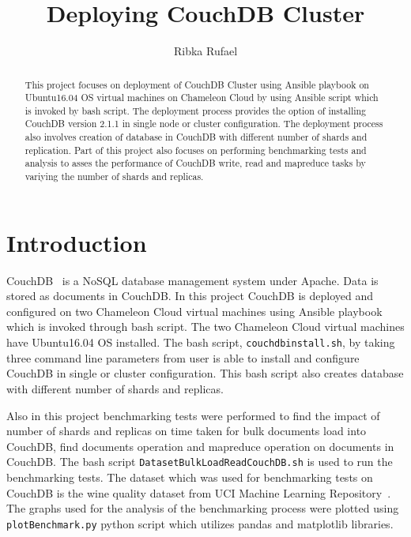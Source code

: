 \title{Deploying CouchDB Cluster}


\author{Ribka Rufael}
\orcid{}



\renewcommand{\shortauthors}{R. Rufael}


\begin{abstract}
  This project focuses on deployment of CouchDB Cluster using Ansible
  playbook on Ubuntu16.04 OS virtual machines on Chameleon Cloud by
  using Ansible script which is invoked by bash script. The deployment
  process provides the option of installing CouchDB version 2.1.1 in single node or
  cluster configuration. The deployment process also involves creation
  of database in CouchDB with different number of shards and replication. Part of this project
  also focuses on performing  benchmarking tests and analysis to asses the
  performance of CouchDB write, read and mapreduce tasks by variying
  the number of shards and replicas. 
\end{abstract}



\maketitle

\section{Introduction}

CouchDB~\cite{www-Couchdb} is a NoSQL database management system
under Apache. Data is stored as documents in CouchDB. In this project
CouchDB is deployed and configured on two Chameleon Cloud virtual machines using
Ansible playbook which is invoked through bash script. The two Chameleon
Cloud virtual machines have Ubuntu16.04 OS installed. The bash script, 
\verb|couchdbinstall.sh|, by taking three command line parameters from user is
able to install and configure CouchDB in single or cluster
configuration.  This bash script also creates database with different
number of shards and replicas. 

Also in this project benchmarking tests were performed to find the
impact of number of shards and replicas on time taken for bulk
documents load into CouchDB, find documents operation and mapreduce
operation on documents in CouchDB. The bash script \verb|DatasetBulkLoadReadCouchDB.sh| is used to run the
benchmarking tests.  The dataset which
was used for benchmarking tests on CouchDB is the wine quality dataset
from UCI Machine Learning Repository~\cite{www-WineQuality}. The
graphs used for the analysis of the benchmarking process were plotted
using \verb|plotBenchmark.py| python script which utilizes pandas and
matplotlib libraries.

